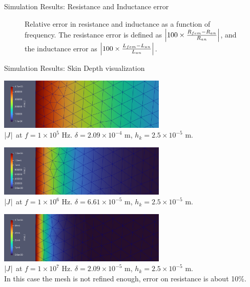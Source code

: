 \documentclass[aspectratio=54,xcolor=dvipsnames]{beamer}
\begin{document}
\begin{frame}{Simulation Results: Resistance and Inductance error}
\begin{center}
\begin{minipage}{0.49\textwidth}
\begin{figure}[H]
            \caption{Relative error in resistance and inductance as a function of frequency. The resistance error is defined as $\abs{100 \times \frac{R_{fem} - R_{an}}{R_{an}}}$, and the inductance error as $\abs{100 \times \frac{L_{fem} - L_{an}}{L_{an}}}$.}
        \end{figure}
    \end{minipage}
    \end{center}
\end{frame}

\begin{frame}{Simulation Results: Skin Depth visualization}
    \scriptsize
    \begin{center}
        \includegraphics[width=0.6\textwidth]{Images/Skin_depth_f_1e5.png}\\
        \scriptsize $\abs{J}$ at $f = 1 \times 10^5$ Hz. $\delta = 2.09 \times 10^{-4}$ m, $h_k = 2.5 \times 10^{-5}$ m. 
        \vspace{0.5em}

        \includegraphics[width=0.6\textwidth]{Images/Skin_depth_f_1e6.png}\\
        \scriptsize $\abs{J}$ at $f = 1 \times 10^6$ Hz. $\delta = 6.61 \times 10^{-5}$ m, $h_k = 2.5 \times 10^{-5}$ m.
        \vspace{0.5em}

        \includegraphics[width=0.6\textwidth]{Images/Skin_depth_f_1e7.png}\\
        \scriptsize $\abs{J}$ at $f = 1 \times 10^7$ Hz. $\delta = 2.09 \times 10^{-5}$ m, $h_k = 2.5 \times 10^{-5}$ m. \\ 
        In this case the mesh is not refined enough, error on resistance is about 10\%.
    \end{center}
\end{frame}
\end{document}
